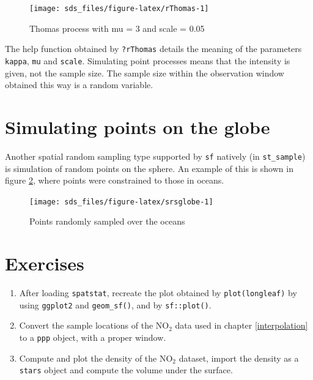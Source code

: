 \documentclass[]{book}
\providecommand{\tightlist}{%
  \setlength{\itemsep}{0pt}\setlength{\parskip}{0pt}}
\begin{document}
\begin{figure}

{\centering \texttt{[image: sds\_files/figure-latex/rThomas-1]} 

}

\caption{Thomas process with mu = 3 and scale = 0.05}\label{fig:rThomas}
\end{figure}

The help function obtained by \texttt{?rThomas} details the meaning of the
parameters \texttt{kappa}, \texttt{mu} and \texttt{scale}. Simulating point processes
means that the intensity is given, not the sample size. The sample
size within the observation window obtained this way is a random
variable.

\hypertarget{simulating-points-on-the-globe}{%
\section{Simulating points on the globe}\label{simulating-points-on-the-globe}}

Another spatial random sampling type supported by \texttt{sf} natively
(in \texttt{st\_sample}) is simulation of random points on the sphere. An
example of this is shown in figure \ref{fig:srsglobe}, where points
were constrained to those in oceans.

\begin{figure}

{\centering \texttt{[image: sds\_files/figure-latex/srsglobe-1]} 

}

\caption{Points randomly sampled over the oceans}\label{fig:srsglobe}
\end{figure}

\hypertarget{exercises-9}{%
\section{Exercises}\label{exercises-9}}

\begin{enumerate}
\def\labelenumi{\arabic{enumi}.}
\tightlist
\item
  After loading \texttt{spatstat}, recreate the plot obtained by \texttt{plot(longleaf)}
  by using \texttt{ggplot2} and \texttt{geom\_sf()}, and by \texttt{sf::plot()}.
\item
  Convert the sample locations of the NO\(_2\) data used in chapter \ref{interpolation}
  to a \texttt{ppp} object, with a proper window.
\item
  Compute and plot the density of the NO\(_2\) dataset, import the density as a \texttt{stars}
  object and compute the volume under the surface.
\end{enumerate}
\end{document}
